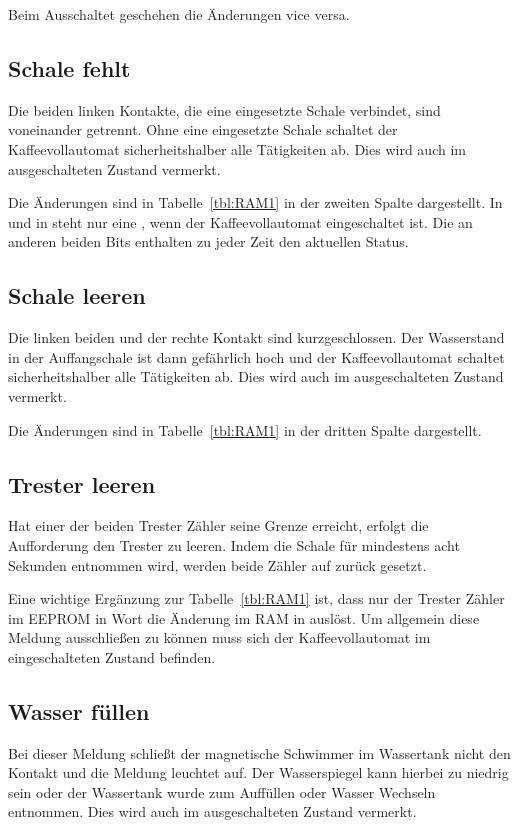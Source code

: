 Beim Ausschaltet geschehen die Änderungen vice versa.

\subsection{Schale fehlt}
Die beiden linken Kontakte, die eine eingesetzte Schale verbindet, sind voneinander getrennt.
Ohne eine eingesetzte Schale schaltet der Kaffeevollautomat sicherheitshalber alle Tätigkeiten ab.
Dies wird auch im ausgeschalteten Zustand vermerkt.

Die Änderungen sind in Tabelle~\ref{tbl:RAM1} in der zweiten Spalte dargestellt.
In  und in  steht nur eine , wenn der Kaffeevollautomat eingeschaltet ist.
Die an anderen beiden Bits enthalten zu jeder Zeit den aktuellen Status.

\subsection{Schale leeren}
Die linken beiden und der rechte Kontakt sind kurzgeschlossen.
Der Wasserstand in der Auffangschale ist dann gefährlich hoch und der Kaffeevollautomat schaltet sicherheitshalber alle Tätigkeiten ab.
Dies wird auch im ausgeschalteten Zustand vermerkt.

Die Änderungen sind in Tabelle~\ref{tbl:RAM1} in der dritten Spalte dargestellt.

\subsection{Trester leeren}
Hat einer der beiden Trester Zähler seine Grenze erreicht, erfolgt die Aufforderung den Trester zu leeren.
Indem die Schale für mindestens acht Sekunden entnommen wird, werden beide Zähler auf  zurück gesetzt.

Eine wichtige Ergänzung zur Tabelle~\ref{tbl:RAM1} ist, dass nur der Trester Zähler im \ac{EEPROM} in Wort  die Änderung im \ac{RAM} in  auslöst.
Um allgemein diese Meldung ausschließen zu können muss sich der Kaffeevollautomat im eingeschalteten Zustand befinden.

\subsection{Wasser füllen} %
Bei dieser Meldung schließt der magnetische Schwimmer im Wassertank nicht den Kontakt und die Meldung leuchtet auf.
Der Wasserspiegel kann hierbei zu niedrig sein oder der Wassertank wurde zum Auffüllen oder Wasser Wechseln entnommen.
Dies wird auch im ausgeschalteten Zustand vermerkt.

